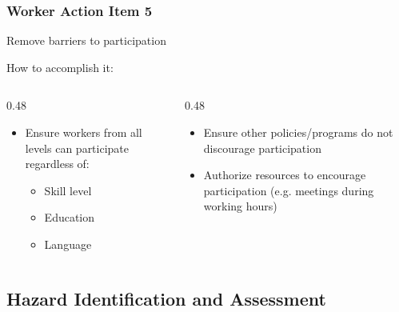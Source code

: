 \begin{frame}
    \frametitle{Worker Action Item 5}

    Remove barriers to participation

    \begin{block}{How to accomplish it:}
        \vspace{-1.5em}
        \begin{columns}[t]
            \begin{column}{0.48\linewidth}
                \begin{itemize}
                    \item Ensure workers from all levels can participate regardless of:
                    \begin{itemize}
                        \item Skill level
                        \item Education
                        \item Language
                    \end{itemize}
                \end{itemize}
            \end{column}
            \begin{column}{0.48\linewidth}
                \begin{itemize}
                    \item Ensure other policies/programs do not discourage participation
                    \item Authorize resources to encourage participation (e.g. meetings during working hours)
                \end{itemize}
            \end{column}
        \end{columns}    
    \end{block}
\end{frame}

\subsection{Hazard Identification and Assessment}

